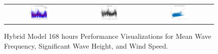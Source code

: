 \begin{figure}[ht!]
\begin{tabular}{ccc}
    \includegraphics[width=0.32\textwidth]{graphs/hybrid/168 hours/wind_speed/actual vs forecast.jpg} &
    \includegraphics[width=0.32\textwidth]{graphs/hybrid/168 hours/wind_speed/residuals.jpg} &
    \includegraphics[width=0.32\textwidth]{graphs/hybrid/168 hours/wind_speed/scatter plot.jpg} \\
  \end{tabular}
  \caption{Hybrid Model 168 hours Performance Visualizations for Mean Wave Frequency, Significant Wave Height, and Wind Speed.}
  \label{fig:hybrid_168_hours}
\end{figure}

